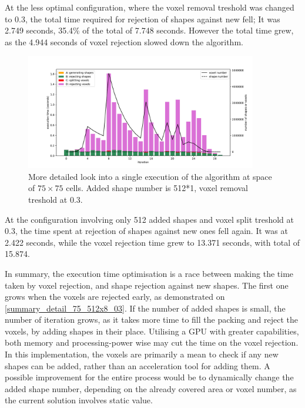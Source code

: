 \documentclass[12pt, oneside]{report}
\begin{document}
At the less optimal configuration, where the voxel removal treshold was changed to 0.3, the total time required for rejection of shapes against new fell; It was 2.749 seconds, 35.4\% of the total of 7.748 seconds. However the total time grew, as the 4.944 seconds of voxel rejection slowed down the algorithm.

\begin{figure}[H]
  \centering
	\includegraphics[width=0.9\textwidth,keepaspectratio]{Images/SummaryOptimisation/iter_75_512x1_03_v2.pdf}
	\caption{More detailed look into a single execution of the algorithm at space of $75 \times 75$ cells. Added shape number is 512*1, voxel removal treshold at 0.3.}
	\label{summary_detail_75_512x1_03}
\end{figure}

At the configuration involving only 512 added shapes and voxel split treshold at 0.3, the time spent at rejection of shapes against new ones fell again. It was at 2.422 seconds, while the voxel rejection time grew to 13.371 seconds, with total of 15.874. \newline

In summary, the execution time optimisation is a race between making the time taken by voxel rejection, and shape rejection against new shapes. The first one grows when the voxels are rejected early, as demonstrated on \ref{summary_detail_75_512x8_03}. If the number of added shapes is small, the number of iteration grows, as it takes more time to fill the packing and reject the voxels, by adding shapes in their place. Utilising a GPU with greater capabilities, both memory and processing-power wise may cut the time on the voxel rejection. \newline
In this implementation, the voxels are primarily a mean to check if any new shapes can be added, rather than an acceleration tool for adding them. A possible improvement for the entire process would be to dynamically change the added shape number, depending on the already covered area or voxel number, as the current solution involves static value.
\end{document}
